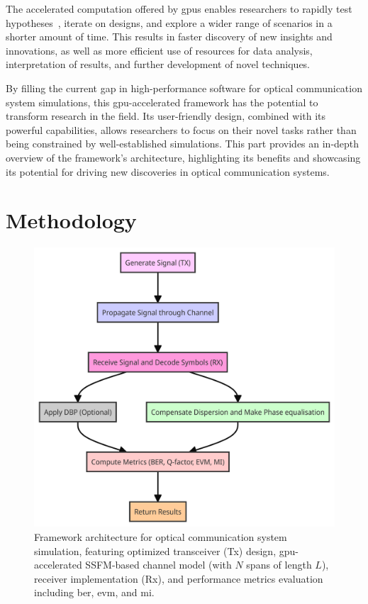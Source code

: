 The accelerated computation offered by \acrshort{gpu}s enables researchers to rapidly test hypotheses~\cite{winzer2012optical}, iterate on designs, and explore a wider range of scenarios in a shorter amount of time. This results in faster discovery of new insights and innovations, as well as more efficient use of resources for data analysis, interpretation of results, and further development of novel techniques.

By filling the current gap in high-performance software for optical communication system simulations, this \acrshort{gpu}-accelerated framework has the potential to transform research in the field. Its user-friendly design, combined with its powerful capabilities, allows researchers to focus on their novel tasks rather than being constrained by well-established simulations. This part provides an in-depth overview of the framework's architecture, highlighting its benefits and showcasing its potential for driving new discoveries in optical communication systems.


\section{Methodology}

\begin{figure}[t]
   \centering
        \includegraphics[width=0.7\linewidth]{images/hpcom/hpcom_pipe.png}
    \caption{Framework architecture for optical communication system simulation, featuring optimized transceiver (Tx) design, \acrshort{gpu}-accelerated SSFM-based channel model (with $N$ spans of length $L$), receiver implementation (Rx), and performance metrics evaluation including \acrshort{ber}, \acrshort{evm}, and \acrshort{mi}.}
    \label{fig:hpcom_scheme}
\end{figure}

